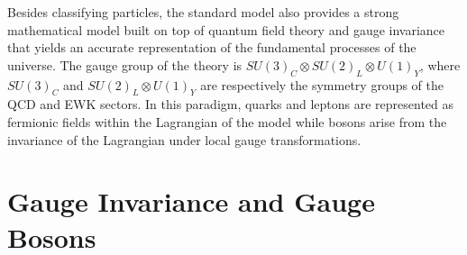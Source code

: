   Besides classifying particles, the standard model also provides a strong mathematical model built on top of quantum field theory and gauge invariance that yields an accurate representation of the fundamental processes of the universe. The gauge group of the theory is $ SU(3)_C \otimes SU(2)_L \otimes U(1)_Y $, where $ SU(3)_C $ and $ SU(2)_L \otimes U(1)_Y $ are respectively the symmetry groups of the QCD and EWK sectors. In this paradigm, quarks and leptons are represented as fermionic fields within the Lagrangian of the model while bosons arise from the invariance of the Lagrangian under local gauge transformations. \\

  \section{Gauge Invariance and Gauge Bosons}

